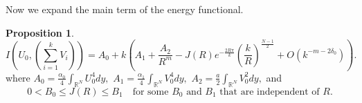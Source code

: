 \documentclass{amsart}
\newtheorem{lemma}[theorem]{Lemma}
\theoremstyle{definition}
\newtheorem{proposition}[theorem]{Proposition}
\theoremstyle{remark}
\numberwithin{equation}{section}
\begin{document}
Now we expand the main term of the energy functional.
\begin{proposition}\label{A.3} 
\begin{equation*}
I\left(U_0, \left( \sum_{i=1}^k V_{i}\right)\right)  
= A_0+ 
 k\left(A_1+\frac{A_2}{R^{m}}-J(R) e^{-\frac{2R\pi}{k}}\left(\frac{k}{R}\right)^{\frac{N-1}{2}}+O\left(k^{-m-2\delta_0}\right)\right).
\end{equation*}
where   $\displaystyle A_0=\frac{\alpha_0}{4} \int_{\mathbb{R}^{N}} U_0^{4}dy,$ $\displaystyle 
A_1=\frac{\alpha_1}{4} \int_{\mathbb{R}^{N}} V_0^{4}dy,$   $\displaystyle A_2=\frac{a}{2} \int_{\mathbb{R}^{N}} V_0^{2}dy,$ and 
$$0< B_0\le J(R)\le B_1 \quad \text{for some $B_0$ and $B_1$ that are independent of $R$.} $$
\end{proposition}
\end{document}
